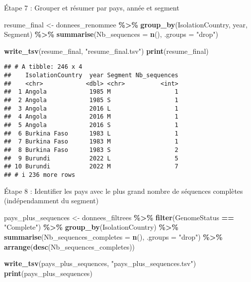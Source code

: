 \documentclass[
]{article}
\newenvironment{Shaded}{\begin{snugshade}}{\end{snugshade}}
\newcommand{\AttributeTok}[1]{\textcolor[rgb]{0.13,0.29,0.53}{#1}}
\newcommand{\FunctionTok}[1]{\textcolor[rgb]{0.13,0.29,0.53}{\textbf{#1}}}
\newcommand{\NormalTok}[1]{#1}
\newcommand{\OtherTok}[1]{\textcolor[rgb]{0.56,0.35,0.01}{#1}}
\newcommand{\SpecialCharTok}[1]{\textcolor[rgb]{0.81,0.36,0.00}{\textbf{#1}}}
\newcommand{\StringTok}[1]{\textcolor[rgb]{0.31,0.60,0.02}{#1}}
\begin{document}
Étape 7 : Grouper et résumer par pays, année et segment

\begin{Shaded}
\begin{Highlighting}[]
\NormalTok{resume\_final }\OtherTok{\textless{}{-}}\NormalTok{ donnees\_renommee }\SpecialCharTok{\%\textgreater{}\%}
  \FunctionTok{group\_by}\NormalTok{(IsolationCountry, year, Segment) }\SpecialCharTok{\%\textgreater{}\%}
  \FunctionTok{summarise}\NormalTok{(}\AttributeTok{Nb\_sequences =} \FunctionTok{n}\NormalTok{(), }\AttributeTok{.groups =} \StringTok{"drop"}\NormalTok{)}

\FunctionTok{write\_tsv}\NormalTok{(resume\_final, }\StringTok{"resume\_final.tsv"}\NormalTok{)}
\FunctionTok{print}\NormalTok{(resume\_final)}
\end{Highlighting}
\end{Shaded}

\begin{verbatim}
## # A tibble: 246 x 4
##    IsolationCountry  year Segment Nb_sequences
##    <chr>            <dbl> <chr>          <int>
##  1 Angola            1985 M                  1
##  2 Angola            1985 S                  1
##  3 Angola            2016 L                  1
##  4 Angola            2016 M                  1
##  5 Angola            2016 S                  1
##  6 Burkina Faso      1983 L                  1
##  7 Burkina Faso      1983 M                  1
##  8 Burkina Faso      1983 S                  2
##  9 Burundi           2022 L                  5
## 10 Burundi           2022 M                  7
## # i 236 more rows
\end{verbatim}

Étape 8 : Identifier les pays avec le plus grand nombre de séquences
complètes (indépendamment du segment)

\begin{Shaded}
\begin{Highlighting}[]
\NormalTok{pays\_plus\_sequences }\OtherTok{\textless{}{-}}\NormalTok{ donnees\_filtrees }\SpecialCharTok{\%\textgreater{}\%}
  \FunctionTok{filter}\NormalTok{(GenomeStatus }\SpecialCharTok{==} \StringTok{"Complete"}\NormalTok{) }\SpecialCharTok{\%\textgreater{}\%}
  \FunctionTok{group\_by}\NormalTok{(IsolationCountry) }\SpecialCharTok{\%\textgreater{}\%}
  \FunctionTok{summarise}\NormalTok{(}\AttributeTok{Nb\_sequences\_completes =} \FunctionTok{n}\NormalTok{(), }\AttributeTok{.groups =} \StringTok{"drop"}\NormalTok{) }\SpecialCharTok{\%\textgreater{}\%}
  \FunctionTok{arrange}\NormalTok{(}\FunctionTok{desc}\NormalTok{(Nb\_sequences\_completes))}

\FunctionTok{write\_tsv}\NormalTok{(pays\_plus\_sequences, }\StringTok{"pays\_plus\_sequences.tsv"}\NormalTok{)}
\FunctionTok{print}\NormalTok{(pays\_plus\_sequences)}
\end{Highlighting}
\end{Shaded}
\end{document}
